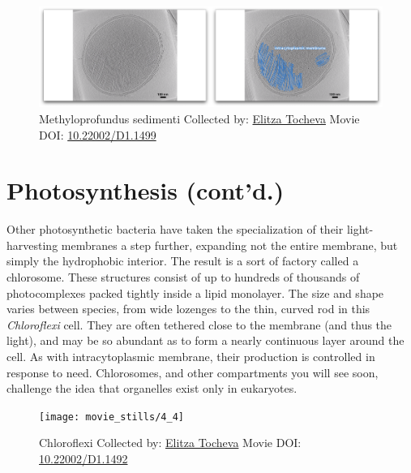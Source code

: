 \documentclass[]{tufte-book}
\begin{document}
\begin{figure}
\includegraphics{movie_stills/4_3a} \caption[Methyloprofundus sedimenti Collected by:
\protect\hyperlink{elitza_tocheva}{Elitza Tocheva} Movie DOI:
\href{https://doi.org/10.22002/D1.1499}{10.22002/D1.1499}]{Methyloprofundus sedimenti Collected by:
\protect\hyperlink{elitza_tocheva}{Elitza Tocheva} Movie DOI:
\href{https://doi.org/10.22002/D1.1499}{10.22002/D1.1499}}\label{fig:4-3a}
\end{figure}

\section{Photosynthesis (cont'd.)}\label{photosynthesis-contd.}

Other photosynthetic bacteria have taken the specialization of their
light-harvesting membranes a step further, expanding not the entire
membrane, but simply the hydrophobic interior. The result is a sort of
factory called a chlorosome. These structures consist of up to hundreds
of thousands of photocomplexes packed tightly inside a lipid monolayer.
The size and shape varies between species, from wide lozenges to the
thin, curved rod in this \emph{Chloroflexi} cell. They are often
tethered close to the membrane (and thus the light), and may be so
abundant as to form a nearly continuous layer around the cell. As with
intracytoplasmic membrane, their production is controlled in response to
need. Chlorosomes, and other compartments you will see soon, challenge
the idea that organelles exist only in eukaryotes.





\begin{figure}
\texttt{[image: movie\_stills/4\_4]} \caption[Chloroflexi Collected by:
\protect\hyperlink{elitza_tocheva}{Elitza Tocheva} Movie DOI:
\href{https://doi.org/10.22002/D1.1492}{10.22002/D1.1492}]{Chloroflexi Collected by:
\protect\hyperlink{elitza_tocheva}{Elitza Tocheva} Movie DOI:
\href{https://doi.org/10.22002/D1.1492}{10.22002/D1.1492}}\label{fig:4-4}
\end{figure}
\end{document}
